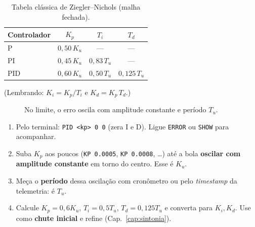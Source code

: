 \begin{table}[h]\centering
\caption{Tabela cl\'assica de Ziegler--Nichols (malha fechada).}
\label{tab:zn}
\begin{tabular}{lccc}
\toprule
Controlador & $K_p$ & $T_i$ & $T_d$ \\ \midrule
P   & $0{,}50\,K_u$ & --- & --- \\
PI  & $0{,}45\,K_u$ & $0{,}83\,T_u$ & --- \\
PID & $0{,}60\,K_u$ & $0{,}50\,T_u$ & $0{,}125\,T_u$ \\
\bottomrule
\end{tabular}
\end{table}
\noindent (Lembrando: $K_i=K_p/T_i$ e $K_d=K_p\,T_d$.)

\begin{figure}[h]\centering
{}
\caption{No limite, o erro oscila com amplitude constante e per\'iodo $T_u$.}
\label{fig:zn}
\end{figure}

\begin{projeto}
\begin{enumerate}[leftmargin=1.5em]
  \item Pelo terminal: \texttt{PID <kp> 0 0} (zera I e D). Ligue \texttt{ERROR} ou
  \texttt{SHOW} para acompanhar.
  \item Suba $K_p$ aos poucos (\texttt{KP 0.0005}, \texttt{KP 0.0008}, \dots) at\'e a
  bola \textbf{oscilar com amplitude constante} em torno do centro. Esse \'e $K_u$.
  \item Me\c{c}a o \textbf{per\'iodo} dessa oscila\c{c}\~ao com cron\^ometro ou pelo
  \emph{timestamp} da telemetria: \'e $T_u$.
  \item Calcule $K_p=0{,}6K_u$, $T_i=0{,}5T_u$, $T_d=0{,}125T_u$ e converta para
  $K_i,K_d$. Use como \textbf{chute inicial} e refine (Cap.~\ref{cap:sintonia}).
\end{enumerate}
\end{projeto}

